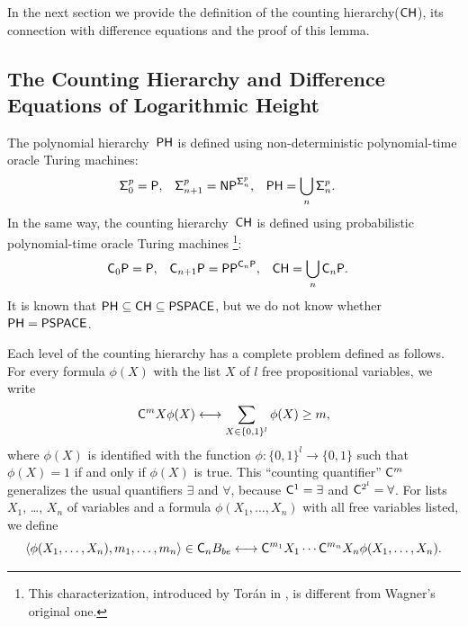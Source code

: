In the next section we provide 
the definition of the counting hierarchy($\mathsf{CH}$),
its connection with difference equations and 
the proof of this lemma.


\subsection{The Counting Hierarchy and Difference Equations of Logarithmic Height}
\label{subsection: counting hierarchy}

The polynomial hierarchy~$\mathsf{PH}$ is defined using non-deterministic polynomial-time oracle Turing machines: 
\begin{align}
 \mathsf{\Sigma}^p_0  &= \mathsf{P},
 &
 \mathsf{\Sigma}^p_{n+1} &= \mathsf{NP} ^{\mathsf{\Sigma}^p_n},
 &
 \mathsf{PH} &= \bigcup_n \mathsf{\Sigma}^p_n.
\end{align}
In the same way, the counting hierarchy~$\mathsf{CH}$
\cite{wagner1986complexity} 
is defined
using probabilistic polynomial-time oracle Turing machines%
\footnote{This characterization, introduced by Tor{\'a}n 
in \cite{toran1991complexity}, is different from Wagner's original one.
}: 
\begin{align} \label{eq:CH}
 \mathsf{C}_0 \mathsf{P}  &= \mathsf{P},
 &
 \mathsf{C}_{n+1} \mathsf{P} &= \mathsf{PP}^{\mathsf{C}_n \mathsf{P}},
 &
 \mathsf{CH} &= \bigcup_n \mathsf{C}_n \mathsf{P}.
\end{align}
It is known that $\mathsf{PH} \subseteq \mathsf{CH} \subseteq \mathsf{PSPACE}$, 
but we do not know whether $\mathsf{PH} = \mathsf{PSPACE}$.


Each level of the counting hierarchy 
has a complete problem defined as follows.
For every formula $\phi(X)$ with the list $X$ of $l$ free propositional variables,
we write 
\begin{equation}
 \mathsf{C}^m X \phi(X) 
  \longleftrightarrow 
  \sum_{X \in \{0,1\}^l} \phi(X) \ge m,
\end{equation}
where $\phi(X)$ is identified with the function 
$\phi \colon \{0,1\}^l \to \{0,1\}$
such that $\phi(X) = 1$ if and only if $\phi(X)$ is true.
This ``counting quantifier'' $\mathsf{C} ^m$ generalizes 
the usual quantifiers $\exists$ and $\forall$, 
because $\mathsf{C}^1 = \exists$ and $\mathsf{C}^{2^l} = \forall$.
For lists $X _1$, \ldots, $X _n$ of variables 
and a formula $\phi(X_1, \dots, X_n)$ with all free variables listed, 
we define
\begin{equation}
 \langle \phi(X_1, \dots, X_n), m_1, \dots, m_n \rangle \in \mathsf{C}_n B_{be}
 \longleftrightarrow
 \mathsf{C}^{m_1}{X_1} \cdots \mathsf{C}^{m_n}{X_n} \phi(X_1, \dots, X_n).
\end{equation}

